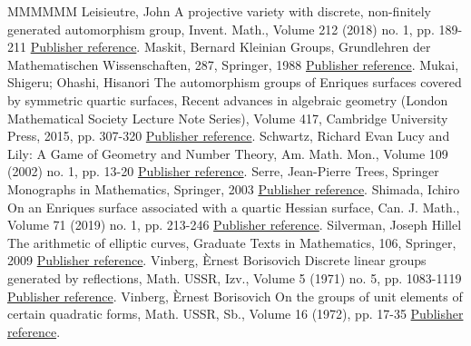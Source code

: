 \documentclass[11pt]{article}
\theoremstyle{definition}
\numberwithin{equation}{section}
\numberwithin{figure}{section}
\numberwithin{table}{section}
\begin{document}
\begin{thebibliography}{MMMMMM}
 Leisieutre, John A projective variety with discrete, non-finitely generated automorphism group, Invent. Math., Volume 212 (2018) no. 1, pp. 189-211 \href{https://ahl.centre-mersenne.org/item/AHL_2020__3__1133_0/#Lesieutre}{Publisher reference}.
 Maskit, Bernard Kleinian Groups, Grundlehren der Mathematischen Wissenschaften, 287, Springer, 1988 \href{https://ahl.centre-mersenne.org/item/AHL_2020__3__1133_0/#Maskit}{Publisher reference}.
 Mukai, Shigeru; Ohashi, Hisanori The automorphism groups of Enriques surfaces covered by symmetric quartic surfaces, Recent advances in algebraic geometry (London Mathematical Society Lecture Note Series), Volume 417, Cambridge University Press, 2015, pp. 307-320 \href{https://ahl.centre-mersenne.org/item/AHL_2020__3__1133_0/#Mukai}{Publisher reference}.
 Schwartz, Richard Evan Lucy and Lily: A Game of Geometry and Number Theory, Am. Math. Mon., Volume 109 (2002) no. 1, pp. 13-20 \href{https://ahl.centre-mersenne.org/item/AHL_2020__3__1133_0/#Schwartz}{Publisher reference}.
 Serre, Jean-Pierre Trees, Springer Monographs in Mathematics, Springer, 2003 \href{https://ahl.centre-mersenne.org/item/AHL_2020__3__1133_0/#Trees}{Publisher reference}.
 Shimada, Ichiro On an Enriques surface associated with a quartic Hessian surface, Can. J. Math., Volume 71 (2019) no. 1, pp. 213-246 \href{https://ahl.centre-mersenne.org/item/AHL_2020__3__1133_0/#Shimada}{Publisher reference}.
 Silverman, Joseph Hillel The arithmetic of elliptic curves, Graduate Texts in Mathematics, 106, Springer, 2009 \href{https://ahl.centre-mersenne.org/item/AHL_2020__3__1133_0/#Silverman}{Publisher reference}.
 Vinberg, Èrnest Borisovich Discrete linear groups generated by reflections, Math. USSR, Izv., Volume 5 (1971) no. 5, pp. 1083-1119 \href{https://ahl.centre-mersenne.org/item/AHL_2020__3__1133_0/#Vinberg2}{Publisher reference}.
 Vinberg, Èrnest Borisovich On the groups of unit elements of certain quadratic forms, Math. USSR, Sb., Volume 16 (1972), pp. 17-35 \href{https://ahl.centre-mersenne.org/item/AHL_2020__3__1133_0/#Vinberg}{Publisher reference}.
\end{thebibliography}
\end{document}

